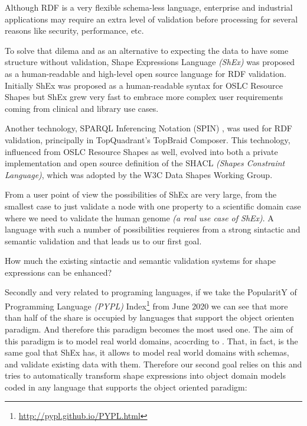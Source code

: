 Although RDF is a very flexible schema-less language, enterprise and industrial applications may require an extra level of
validation before processing for several reasons like security, performance, etc.

To solve that dilema and as an alternative to expecting the data to have some structure without validation, Shape Expressions Language
\textit{(ShEx)} was proposed as a human-readable and high-level open source language for RDF validation. Initially ShEx was proposed
as a human-readable syntax for OSLC Resource Shapes \cite{oslc-resource-shape} but ShEx grew very fast to embrace more
complex user requirements coming from clinical and library use cases.

Another technology, SPARQL Inferencing Notation (SPIN) \cite{knublauch2011spin}, was used for RDF validation, principally in TopQuadrant’s TopBraid Composer. This technology, influenced
from OSLC Resource Shapes as well, evolved into both a private implementation and open source definition of the SHACL
\textit{(Shapes Constraint Language)}, which was adopted by the W3C Data Shapes Working Group.

From a user point of view the possibilities of ShEx are very large, from the smallest case to just validate a node with one property
to a scientific domain case where we need to validate the human genome \textit{(a real use case of ShEx)}. A language with such a number
of possibilities requieres from a strong sintactic and semantic validation and that leads us to our first goal.

\begin{researchquestion}
  How much the existing sintactic and semantic validation systems for shape expressions can be enhanced?
\end{researchquestion}

Secondly and very related to programing languages, if we take the PopularitY of Programming Language \textit{(PYPL)} Index\footnote{\url{http://pypl.github.io/PYPL.html}}
from June 2020 we can see that more than half of the share is occupied by languages that support the object orienten paradigm. And therefore this paradigm
becomes the most used one. The aim of this paradigm is to model real world domains, acocrding to \cite{wegner1990concepts}. That, in fact, is the same goal
that ShEx has, it allows to model real world domains with schemas, and validate existing data with them. Therefore our second goal relies on this and tries
to automatically transform shape expressions into object domain models coded in any language that supports the object oriented paradigm:


